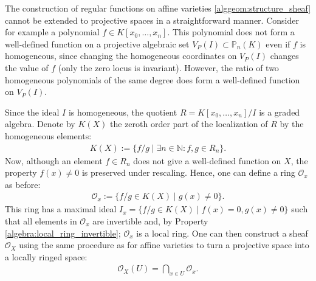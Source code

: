 
    The construction of regular functions on affine varieties \ref{alggeom:structure_sheaf} cannot be extended to projective spaces in a straightforward manner. Consider for example a polynomial $f\in K[x_0,\ldots,x_n]$. This polynomial does not form a well-defined function on a projective algebraic set $V_P(I)\subset\mathbb{P}_n(K)$ even if $f$ is homogeneous, since changing the homogeneous coordinates on $V_P(I)$ changes the value of $f$ (only the zero locus is invariant). However, the ratio of two homogeneous polynomials of the same degree does form a well-defined function on $V_P(I)$.

    Since the ideal $I$ is homogeneous, the quotient $R=K[x_0,\ldots,x_n]/I$ is a graded algebra. Denote by $K(X)$ the zeroth order part of the localization of $R$ by the homogeneous elements:
    \begin{gather}
        K(X) := \{f/g\mid\exists n\in\mathbb{N}:f,g\in R_n\}.
    \end{gather}
    Now, although an element $f\in R_n$ does not give a well-defined function on $X$, the property $f(x)\neq0$ is preserved under rescaling. Hence, one can define a ring $\mathcal{O}_x$ as before:
    \begin{gather}
        \mathcal{O}_x := \{f/g\in K(X)\mid g(x)\neq 0\}.
    \end{gather}
    This ring has a maximal ideal $I_x = \{f/g\in K(X)\mid f(x)=0,g(x)\neq 0\}$ such that all elements in $\mathcal{O}_x$ are invertible and, by Property \ref{algebra:local_ring_invertible}; $\mathcal{O}_x$ is a local ring. One can then construct a sheaf $\mathcal{O}_X$ using the same procedure as for affine varieties to turn a projective space into a locally ringed space:
    \begin{gather}
        \mathcal{O}_X(U) = \bigcap_{x\in U}\mathcal{O}_x.
    \end{gather}

